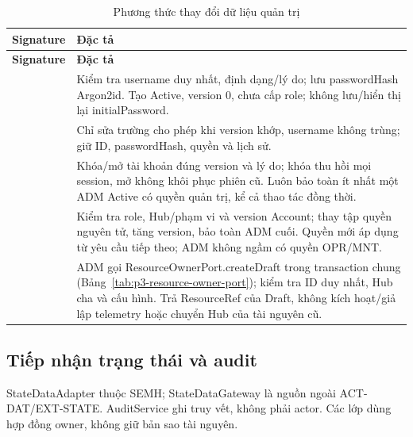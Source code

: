 \begin{longtable}{|L{58mm}|L{81mm}|}
\caption{Phương thức thay đổi dữ liệu quản trị}\\\hline
\textbf{Signature} & \textbf{Đặc tả}\\\hline
\endfirsthead
\hline\textbf{Signature} & \textbf{Đặc tả}\\\hline\endhead
{} &
Kiểm tra username duy nhất, định dạng/lý do; lưu passwordHash Argon2id. Tạo Active, version 0, chưa cấp role; không lưu/hiển thị lại initialPassword.\\\hline
{} &
Chỉ sửa trường cho phép khi version khớp, username không trùng; giữ ID, passwordHash, quyền và lịch sử.\\\hline
{} &
Khóa/mở tài khoản đúng version và lý do; khóa thu hồi mọi session, mở không khôi phục phiên cũ. Luôn bảo toàn ít nhất một ADM Active có quyền quản trị, kể cả thao tác đồng thời.\\\hline
{} &
Kiểm tra role, Hub/phạm vi và version Account; thay tập quyền nguyên tử, tăng version, bảo toàn ADM cuối. Quyền mới áp dụng từ yêu cầu tiếp theo; ADM không ngầm có quyền OPR/MNT.\\\hline
{} &
ADM gọi ResourceOwnerPort.createDraft trong transaction chung (Bảng~\ref{tab:p3-resource-owner-port}); kiểm tra ID duy nhất, Hub cha và cấu hình. Trả ResourceRef của Draft, không kích hoạt/giả lập telemetry hoặc chuyển Hub của tài nguyên cũ.\\\hline
\end{longtable}

\subsection{Tiếp nhận trạng thái và audit}

StateDataAdapter thuộc SEMH; StateDataGateway là nguồn ngoài ACT-DAT/EXT-STATE. AuditService ghi truy vết, không phải actor. Các lớp dùng hợp đồng owner, không giữ bản sao tài nguyên.

